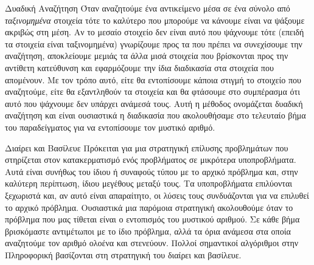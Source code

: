 \documentclass[a4paper,11pt,oneside]{book}
\begin{document}
\begin{theory}{Δυαδική Αναζήτηση}
Όταν αναζητούμε ένα αντικείμενο μέσα σε ένα σύνολο από \emph{ταξινομημένα} στοιχεία τότε το καλύτερο που μπορούμε να κάνουμε είναι να ψάξουμε ακριβώς στη μέση. Αν το μεσαίο στοιχείο δεν είναι αυτό που ψάχνουμε τότε (επειδή τα στοιχεία είναι ταξινομημένα) γνωρίζουμε προς τα που πρέπει να συνεχίσουμε την αναζήτηση, αποκλείουμε μεμιάς τα άλλα μισά στοιχεία που βρίσκονται προς την αντίθετη κατεύθυνση και εφαρμόζουμε την ίδια διαδικασία στα στοιχεία που απομένουν. Με τον τρόπο αυτό, είτε θα εντοπίσουμε κάποια στιγμή το στοιχείο που αναζητούμε, είτε θα εξαντληθούν τα στοιχεία και θα φτάσουμε στο συμπέρασμα ότι αυτό που ψάχνουμε δεν υπάρχει ανάμεσά τους. Αυτή η μέθοδος ονομάζεται δυαδική αναζήτηση και είναι ουσιαστικά η διαδικασία που ακολουθήσαμε στο τελευταίο βήμα του παραδείγματος για να εντοπίσουμε τον μυστικό αριθμό. 
\end{theory}

\begin{theory}{Διαίρει και Βασίλευε}
Πρόκειται για μια στρατηγική επίλυσης προβλημάτων που στηρίζεται στον κατακερματισμό ενός προβλήματος σε μικρότερα υποπροβλήματα. Αυτά είναι συνήθως του ίδιου ή συναφούς τύπου με το αρχικό πρόβλημα και, στην καλύτερη περίπτωση, ίδιου μεγέθους μεταξύ τους. Τα υποπροβλήματα επιλύονται ξεχωριστά και, αν αυτό είναι απαραίτητο, οι λύσεις τους συνδυάζονται για να επιλυθεί το αρχικό πρόβλημα. Ουσιαστικά μια παρόμοια στρατηγική ακολουθούμε όταν το πρόβλημα που μας τίθεται είναι ο εντοπισμός του μυστικού αριθμού. Σε κάθε βήμα βρισκόμαστε αντιμέτωποι με το ίδιο πρόβλημα, αλλά τα όρια ανάμεσα στα οποία αναζητούμε τον αριθμό ολοένα και στενεύουν. Πολλοί σημαντικοί αλγόριθμοι στην Πληροφορική βασίζονται στη στρατηγική του διαίρει και βασίλευε.
\end{theory}

\hrulefill
\end{document}
